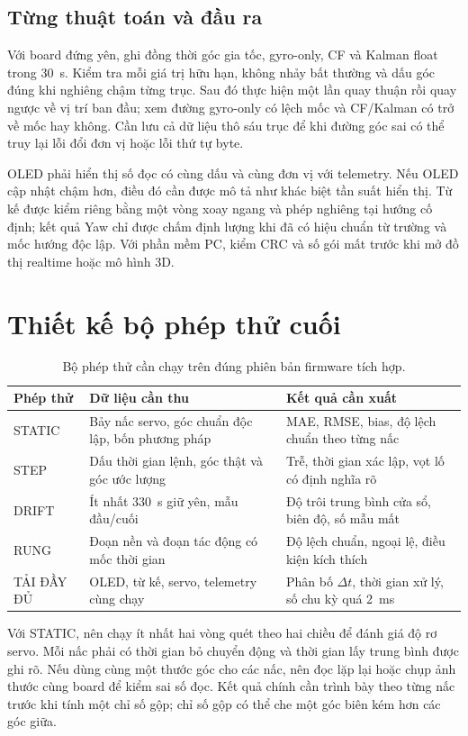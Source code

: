 \subsection{Từng thuật toán và đầu ra}
Với board đứng yên, ghi đồng thời góc gia tốc, gyro-only, CF và Kalman float trong 30~s. Kiểm tra mỗi giá trị hữu hạn, không nhảy bất thường và dấu góc đúng khi nghiêng chậm từng trục. Sau đó thực hiện một lần quay thuận rồi quay ngược về vị trí ban đầu; xem đường gyro-only có lệch mốc và CF/Kalman có trở về mốc hay không. Cần lưu cả dữ liệu thô sáu trục để khi đường góc sai có thể truy lại lỗi đổi đơn vị hoặc lỗi thứ tự byte.

OLED phải hiển thị số đọc có cùng dấu và cùng đơn vị với telemetry. Nếu OLED cập nhật chậm hơn, điều đó cần được mô tả như khác biệt tần suất hiển thị. Từ kế được kiểm riêng bằng một vòng xoay ngang và phép nghiêng tại hướng cố định; kết quả Yaw chỉ được chấm định lượng khi đã có hiệu chuẩn từ trường và mốc hướng độc lập. Với phần mềm PC, kiểm CRC và số gói mất trước khi mở đồ thị realtime hoặc mô hình 3D.

\section{Thiết kế bộ phép thử cuối}
\begin{table}[htbp]\centering\fontsize{11}{15}\selectfont
\caption{Bộ phép thử cần chạy trên đúng phiên bản firmware tích hợp.}\label{tab:final_tests}
\begin{tabular}{|L{27mm}|L{52mm}|L{54mm}|}\hline
Phép thử & Dữ liệu cần thu & Kết quả cần xuất\\\hline
STATIC & Bảy nấc servo, góc chuẩn độc lập, bốn phương pháp & MAE, RMSE, bias, độ lệch chuẩn theo từng nấc\\\hline
STEP & Dấu thời gian lệnh, góc thật và góc ước lượng & Trễ, thời gian xác lập, vọt lố có định nghĩa rõ\\\hline
DRIFT & Ít nhất 330~s giữ yên, mẫu đầu/cuối & Độ trôi trung bình cửa sổ, biên độ, số mẫu mất\\\hline
RUNG & Đoạn nền và đoạn tác động có mốc thời gian & Độ lệch chuẩn, ngoại lệ, điều kiện kích thích\\\hline
TẢI ĐẦY ĐỦ & OLED, từ kế, servo, telemetry cùng chạy & Phân bố $\Delta t$, thời gian xử lý, số chu kỳ quá 2~ms\\\hline
\end{tabular}
\end{table}

Với STATIC, nên chạy ít nhất hai vòng quét theo hai chiều để đánh giá độ rơ servo. Mỗi nấc phải có thời gian bỏ chuyển động và thời gian lấy trung bình được ghi rõ. Nếu dùng cùng một thước góc cho các nấc, nên đọc lặp lại hoặc chụp ảnh thước cùng board để kiểm sai số đọc. Kết quả chính cần trình bày theo từng nấc trước khi tính một chỉ số gộp; chỉ số gộp có thể che một góc biên kém hơn các góc giữa.

